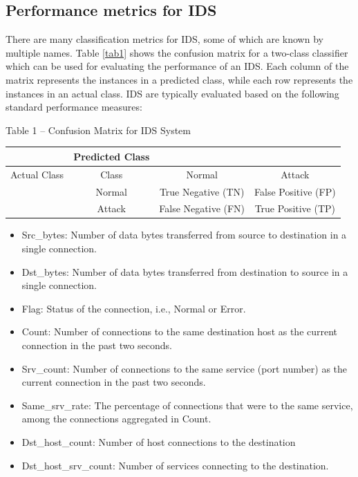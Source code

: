 \documentclass[12pt]{acmart}
\begin{document}
    \subsection{Performance metrics for IDS}
        There are many classification metrics for IDS, some of which are known by multiple names. Table \ref{tab1} shows the confusion matrix for a two-class classifier which can be used for evaluating the performance of an IDS. Each column of the matrix represents the instances in a predicted class, while each row represents the instances in an actual class. IDS are typically evaluated based on the following standard performance measures:\\
        \begin{center}
            Table 1 – Confusion Matrix for IDS System
            \label{tab1}
            \begin{tabular}{|c|c|c|c|}
                \hline
                &Predicted Class &  &\\
                \hline
                Actual Class & Class&Normal&Attack\\
                \hline
                & Normal & True Negative (TN) & False Positive (FP)\\
                \hline
                &Attack&False Negative (FN)&True Positive (TP)\\
                \hline
            \end{tabular}
        \end{center}
        \begin{itemize}
            \item Src\_bytes: Number of data bytes transferred from source to destination in a single connection.
            \item Dst\_bytes: Number of data bytes transferred from destination to source in a single connection.
            \item Flag: Status of the connection, i.e., Normal or Error.
            \item Count: Number of connections to the same destination host as the current connection in the past two seconds.
            \item Srv\_count: Number of connections to the same service (port number) as the current connection in the past two seconds.
            \item Same\_srv\_rate: The percentage of connections that were to the same service, among the connections aggregated in Count.
            \item Dst\_host\_count: Number of host connections to the destination
            \item Dst\_host\_srv\_count: Number of services connecting to the destination.
        \end{itemize}
\end{document}
